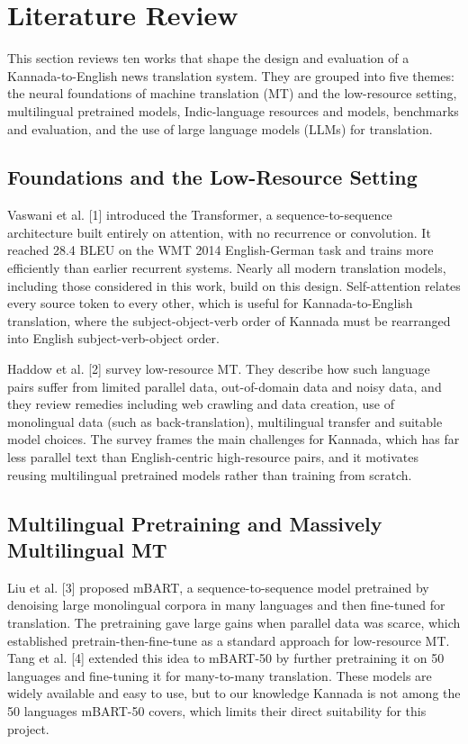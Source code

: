 \documentclass[conference]{IEEEtran}
\begin{document}
\section{Literature Review}
\label{sec:literature_review}

This section reviews ten works that shape the design and evaluation of a Kannada-to-English news translation system. They are grouped into five themes: the neural foundations of machine translation (MT) and the low-resource setting, multilingual pretrained models, Indic-language resources and models, benchmarks and evaluation, and the use of large language models (LLMs) for translation.

\subsection{Foundations and the Low-Resource Setting}
Vaswani et al. [1] introduced the Transformer, a sequence-to-sequence architecture built entirely on attention, with no recurrence or convolution. It reached 28.4 BLEU on the WMT 2014 English-German task and trains more efficiently than earlier recurrent systems. Nearly all modern translation models, including those considered in this work, build on this design. Self-attention relates every source token to every other, which is useful for Kannada-to-English translation, where the subject-object-verb order of Kannada must be rearranged into English subject-verb-object order.

Haddow et al. [2] survey low-resource MT. They describe how such language pairs suffer from limited parallel data, out-of-domain data and noisy data, and they review remedies including web crawling and data creation, use of monolingual data (such as back-translation), multilingual transfer and suitable model choices. The survey frames the main challenges for Kannada, which has far less parallel text than English-centric high-resource pairs, and it motivates reusing multilingual pretrained models rather than training from scratch.

\subsection{Multilingual Pretraining and Massively Multilingual MT}
Liu et al. [3] proposed mBART, a sequence-to-sequence model pretrained by denoising large monolingual corpora in many languages and then fine-tuned for translation. The pretraining gave large gains when parallel data was scarce, which established pretrain-then-fine-tune as a standard approach for low-resource MT. Tang et al. [4] extended this idea to mBART-50 by further pretraining it on 50 languages and fine-tuning it for many-to-many translation. These models are widely available and easy to use, but to our knowledge Kannada is not among the 50 languages mBART-50 covers, which limits their direct suitability for this project.
\end{document}
